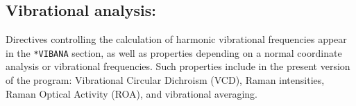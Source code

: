 \subsection{Vibrational analysis: }
\label{sec:abavib}

Directives controlling the calculation of harmonic
vibrational
frequencies appear in the \verb|*VIBANA| section, as well as properties
depending on a normal coordinate analysis or vibrational frequencies.
Such properties include in the present version of the program:
Vibrational Circular Dichroism (VCD), Raman intensities, Raman
Optical Activity (ROA), and vibrational averaging.

